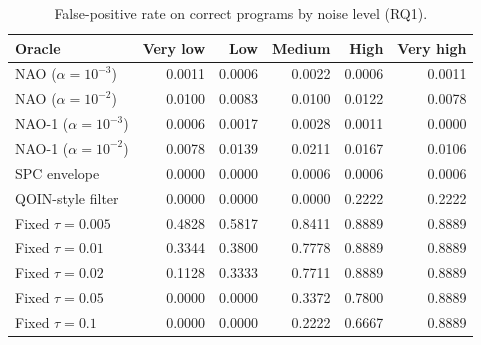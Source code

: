 \begin{table}[t]
\centering
\caption{False-positive rate on correct programs by noise level (RQ1).}
\label{tab:app-fpr-noise}
\small
\begin{tabular}{lrrrrr}
\toprule
Oracle & Very low & Low & Medium & High & Very high \\
\midrule
NAO ($\alpha = 10^{-3}$) & 0.0011 & 0.0006 & 0.0022 & 0.0006 & 0.0011 \\
NAO ($\alpha = 10^{-2}$) & 0.0100 & 0.0083 & 0.0100 & 0.0122 & 0.0078 \\
NAO-1 ($\alpha = 10^{-3}$) & 0.0006 & 0.0017 & 0.0028 & 0.0011 & 0.0000 \\
NAO-1 ($\alpha = 10^{-2}$) & 0.0078 & 0.0139 & 0.0211 & 0.0167 & 0.0106 \\
SPC envelope & 0.0000 & 0.0000 & 0.0006 & 0.0006 & 0.0006 \\
QOIN-style filter & 0.0000 & 0.0000 & 0.0000 & 0.2222 & 0.2222 \\
Fixed $\tau = 0.005$ & 0.4828 & 0.5817 & 0.8411 & 0.8889 & 0.8889 \\
Fixed $\tau = 0.01$ & 0.3344 & 0.3800 & 0.7778 & 0.8889 & 0.8889 \\
Fixed $\tau = 0.02$ & 0.1128 & 0.3333 & 0.7711 & 0.8889 & 0.8889 \\
Fixed $\tau = 0.05$ & 0.0000 & 0.0000 & 0.3372 & 0.7800 & 0.8889 \\
Fixed $\tau = 0.1$ & 0.0000 & 0.0000 & 0.2222 & 0.6667 & 0.8889 \\
\bottomrule
\end{tabular}
\end{table}
